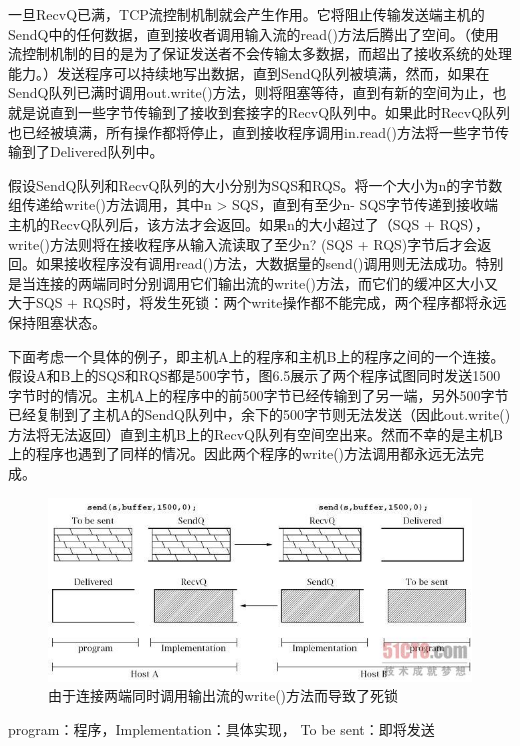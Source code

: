 	一旦RecvQ已满，TCP流控制机制就会产生作用。它将阻止传输发送端主机的SendQ中的任何数据，直到接收者调用输入流的read()方法后腾出了空间。（使用流控制机制的目的是为了保证发送者不会传输太多数据，而超出了接收系统的处理能力。）发送程序可以持续地写出数据，直到SendQ队列被填满，然而，如果在SendQ队列已满时调用out.write()方法，则将阻塞等待，直到有新的空间为止，也就是说直到一些字节传输到了接收到套接字的RecvQ队列中。如果此时RecvQ队列也已经被填满，所有操作都将停止，直到接收程序调用in.read()方法将一些字节传输到了Delivered队列中。

	假设SendQ队列和RecvQ队列的大小分别为SQS和RQS。将一个大小为n的字节数组传递给write()方法调用，其中n > SQS，直到有至少n- SQS字节传递到接收端主机的RecvQ队列后，该方法才会返回。如果n的大小超过了（SQS + RQS），write()方法则将在接收程序从输入流读取了至少n? (SQS + RQS)字节后才会返回。如果接收程序没有调用read()方法，大数据量的send()调用则无法成功。特别是当连接的两端同时分别调用它们输出流的write()方法，而它们的缓冲区大小又大于SQS + RQS时，将发生死锁：两个write操作都不能完成，两个程序都将永远保持阻塞状态。

	下面考虑一个具体的例子，即主机A上的程序和主机B上的程序之间的一个连接。假设A和B上的SQS和RQS都是500字节，图6.5展示了两个程序试图同时发送1500字节时的情况。主机A上的程序中的前500字节已经传输到了另一端，另外500字节已经复制到了主机A的SendQ队列中，余下的500字节则无法发送（因此out.write()方法将无法返回）直到主机B上的RecvQ队列有空间空出来。然而不幸的是主机B上的程序也遇到了同样的情况。因此两个程序的write()方法调用都永远无法完成。

	\clearpage

	\begin{figure}[htbp]%
		\centering
		\includegraphics[scale=.6]{img/06.05.jpg}
		\caption{由于连接两端同时调用输出流的write()方法而导致了死锁}
		\label{fig:dead.lock.by.call.both.side}
	\end{figure}

	program：程序，Implementation：具体实现， To be sent：即将发送

